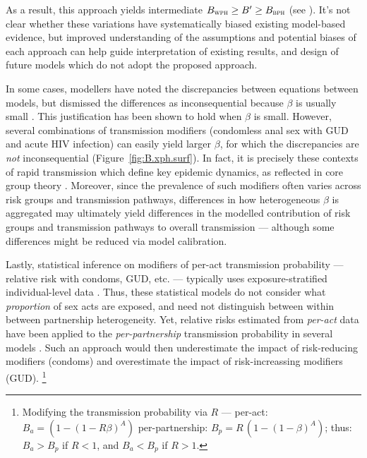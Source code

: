 As a result, this approach yields intermediate $B_{\textsc{wph}} \ge B' \ge B_{\textsc{bph}}$
(see ).
It's not clear whether these variations have systematically biased existing model-based evidence,
but improved understanding of the assumptions and potential biases of each approach
can help guide interpretation of existing results,
and design of future models which do not adopt the proposed approach.
\par
In some cases, modellers have noted the discrepancies between equations between models, %
but dismissed the differences as inconsequential because $\beta$ is usually small  %
\cite{Kerr2015}. %
This justification has been shown to hold when $\beta$ is small. %
However, several combinations of transmission modifiers 
(\eg condomless anal sex with GUD and acute HIV infection) \cite{Boily2009,Fox2011}
can easily yield larger $\beta$, for which the discrepancies are \emph{not} inconsequential
(\eg Figure~\ref{fig:B.xph.surf}).
In fact, it is precisely these contexts of rapid transmission which define key epidemic dynamics,
as reflected in core group theory \cite{Watts2010}.
Moreover, since the prevalence of such modifiers
often varies across risk groups and transmission pathways,
differences in how heterogeneous $\beta$ is aggregated may ultimately yield
differences in the modelled contribution of risk groups and transmission pathways
to overall transmission --- although some differences might be reduced via model calibration.
\par
Lastly, statistical inference on modifiers of per-act transmission probability
--- \eg relative risk with condoms, GUD, etc. --- typically uses
exposure-stratified individual-level data \cite{Jewell1990,Gray2001,Wawer2005,Boily2009}.
Thus, these statistical models do not consider what \emph{proportion} of sex acts are exposed,
and need not distinguish between within \vs between partnership heterogeneity.
Yet, relative risks estimated from \emph{per-act} data
have been applied to the \emph{per-partnership} transmission probability in several models
\cite{TOOD}. %
Such an approach would then
underestimate the impact of risk-reducing modifiers (\eg condoms) and
overestimate the impact of risk-increassing modifiers (\eg GUD).%
\footnote{Modifying the transmission probability via $R$ ---
  per-act: $B_a = (1 - {(1 - R\beta)}^A)$ \vs per-partnership: $B_p = R\,(1 - {(1 - \beta)}^A)$;
  thus: $B_a > B_p$ if $R < 1$, and $B_a < B_p$ if $R > 1$.}
